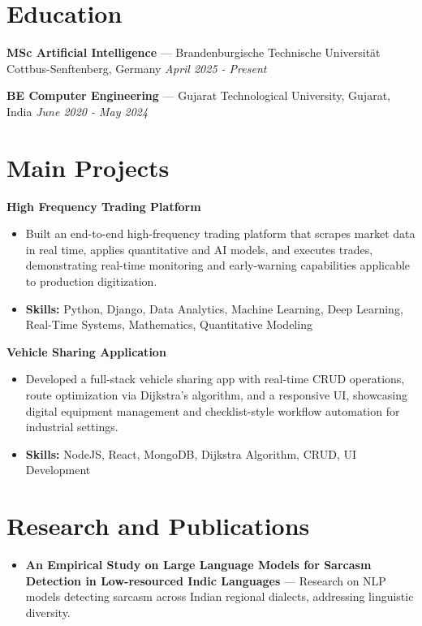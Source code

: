 \documentclass[a4paper,10pt]{article}
\begin{document}
\section*{Education}
\textbf{MSc Artificial Intelligence} — Brandenburgische Technische Universität Cottbus-Senftenberg, Germany \hfill \textit{April 2025 - Present}\par
\vspace{1.5pt}
\textbf{BE Computer Engineering} — Gujarat Technological University, Gujarat, India \hfill \textit{June 2020 - May 2024}\par

\section*{Main Projects}
\textbf{High Frequency Trading Platform}\par
\vspace{1pt}
\begin{itemize}
  \item Built an end-to-end high-frequency trading platform that scrapes market data in real time, applies quantitative and AI models, and executes trades, demonstrating real-time monitoring and early-warning capabilities applicable to production digitization.
  \item \textbf{Skills:} Python, Django, Data Analytics, Machine Learning, Deep Learning, Real-Time Systems, Mathematics, Quantitative Modeling
\end{itemize}
\vspace{3pt}
\textbf{Vehicle Sharing Application}\par
\vspace{1pt}
\begin{itemize}
  \item Developed a full-stack vehicle sharing app with real-time CRUD operations, route optimization via Dijkstra's algorithm, and a responsive UI, showcasing digital equipment management and checklist-style workflow automation for industrial settings.
  \item \textbf{Skills:} NodeJS, React, MongoDB, Dijkstra Algorithm, CRUD, UI Development
\end{itemize}

\section*{Research and Publications}
\begin{itemize}
\item \textbf{An Empirical Study on Large Language Models for Sarcasm Detection in Low-resourced Indic Languages} — Research on NLP models detecting sarcasm across Indian regional dialects, addressing linguistic diversity.
\end{itemize}
\end{document}
